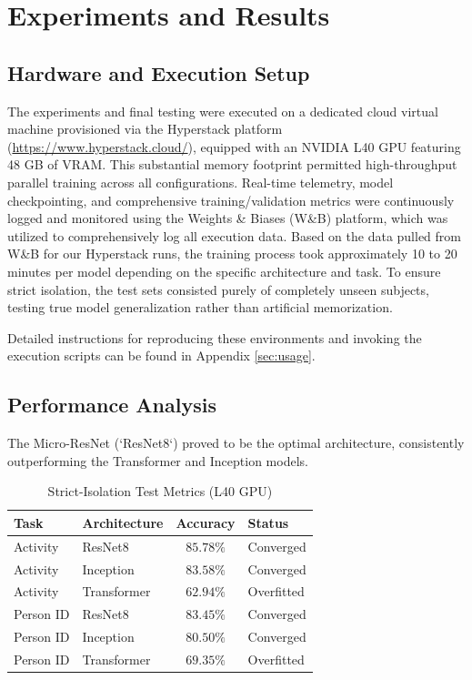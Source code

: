 \section{Experiments and Results}
\label{sec:results}

\subsection{Hardware and Execution Setup}
The experiments and final testing were executed on a dedicated cloud virtual machine provisioned via the Hyperstack platform (\url{https://www.hyperstack.cloud/}), equipped with an NVIDIA L40 GPU featuring 48 GB of VRAM. This substantial memory footprint permitted high-throughput parallel training across all configurations. Real-time telemetry, model checkpointing, and comprehensive training/validation metrics were continuously logged and monitored using the Weights \& Biases (W\&B) platform, which was utilized to comprehensively log all execution data. Based on the data pulled from W\&B for our Hyperstack runs, the training process took approximately 10 to 20 minutes per model depending on the specific architecture and task. To ensure strict isolation, the test sets consisted purely of completely unseen subjects, testing true model generalization rather than artificial memorization.

Detailed instructions for reproducing these environments and invoking the execution scripts can be found in Appendix \ref{sec:usage}.

\subsection{Performance Analysis}
The Micro-ResNet (`ResNet8`) proved to be the optimal architecture, consistently outperforming the Transformer and Inception models.

\begin{table}[h]
\centering
\caption{Strict-Isolation Test Metrics (L40 GPU)}
\begin{tabular}{|l|l|c|l|}
\hline
\textbf{Task} & \textbf{Architecture} & \textbf{Accuracy} & \textbf{Status} \\
\hline
Activity & ResNet8 & $85.78\%$ & Converged \\
Activity & Inception & $83.58\%$ & Converged \\
Activity & Transformer & $62.94\%$ & Overfitted \\
\hline
Person ID & ResNet8 & $83.45\%$ & Converged \\
Person ID & Inception & $80.50\%$ & Converged \\
Person ID & Transformer & $69.35\%$ & Overfitted \\
\hline
\end{tabular}
\label{tab:metrics}
\end{table}

